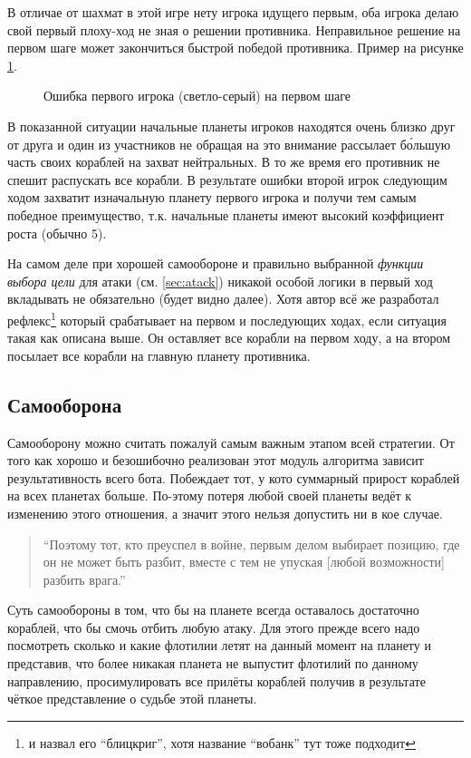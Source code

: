\documentclass[12pt]{report}
\begin{document}
В отличае от шахмат в этой игре нету игрока идущего первым, оба игрока делаю свой первый плоху-ход не зная о решении противника. Неправильное решение на первом шаге может закончиться быстрой победой противника. Пример на рисунке \ref{fig:first_move1}.

\begin{figure}[h]
	\centering
	
	\caption{Ошибка первого игрока (светло-серый) на первом шаге}
	\label{fig:first_move1}
\end{figure}
В показанной ситуации начальные планеты игроков находятся очень близко друг от друга и один из участников не обращая на это внимание рассылает б\'{о}льшую часть своих кораблей на захват нейтральных. В то же время его противник не спешит распускать все корабли. В результате ошибки второй игрок следующим ходом захватит изначальную планету первого игрока и получи тем самым победное преимущество, т.к. начальные планеты имеют высокий коэффициент роста (обычно 5).

На самом деле при хорошей самообороне и правильно выбранной \emph{функции выбора цели} для атаки (см. \ref{sec:atack}) никакой особой логики в первый ход вкладывать не обязательно (будет видно далее). Хотя автор всё же разработал рефлекс\footnote{и назвал его ``блицкриг'', хотя название ``вобанк'' тут тоже подходит} который срабатывает на первом и последующих ходах, если ситуация такая как описана выше. Он оставляет все корабли на первом ходу, а на втором посылает все корабли на главную планету противника.

\subsection{Самооборона}
\label{sec:selfdefense}
Самооборону можно считать пожалуй самым важным этапом всей стратегии. От того как хорошо и безошибочно реализован этот модуль алгоритма зависит результативность всего бота. Побеждает тот, у кото суммарный прирост кораблей на всех планетах больше. По-этому потеря любой своей планеты ведёт к изменению этого отношения, а значит этого нельзя допустить ни в кое случае.
\begin{quote}
``Поэтому тот, кто преуспел в войне, первым делом выбирает позицию, где он не может быть разбит, вместе с тем не упуская [любой возможности] разбить врага.'' \\
\citep{tzu1971art}
\end{quote}

Суть самообороны в том, что бы на планете всегда оставалось достаточно кораблей, что бы смочь отбить любую атаку. Для этого прежде всего надо посмотреть сколько и какие флотилии летят на данный момент на планету и представив, что более никакая планета не выпустит флотилий по данному направлению, просимулировать все прилёты кораблей получив в результате чёткое представление о судьбе этой планеты. 
\end{document}
